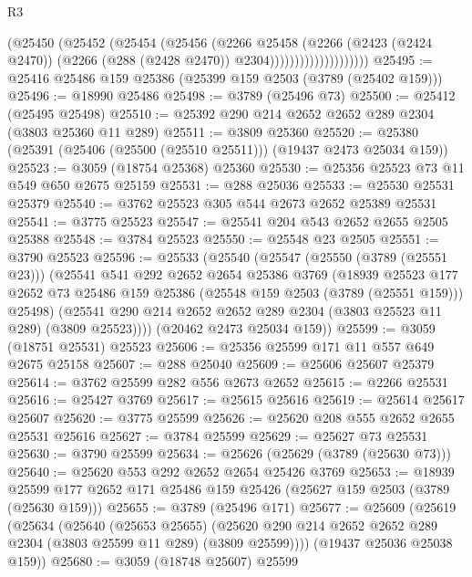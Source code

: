 \begin{lexlean}{R3}
\begin{coremodule}
                              (@25450
                                (@25452
                                  (@25454
                                    (@25456
                                      (@2266
                                        @25458
                                        (@2266
                                          (@2423 (@2424 @2470))
                                          (@2266 (@288 (@2428 @2470)) @2304))))))))))))))))))))
@25495 := @25416 @25486 @159 @25386 (@25399 @159 @2503 (@3789 (@25402 @159)))
@25496 := @18990 @25486
@25498 := @3789 (@25496 @73)
@25500 := @25412 (@25495 @25498)
@25510 := @25392 @290 @214 @2652 @2652 @289 @2304 (@3803 @25360 @11 @289)
@25511 := @3809 @25360
@25520 := @25380 (@25391 (@25406 (@25500 (@25510 @25511))) (@19437 @2473 @25034 @159))
@25523 := @3059 (@18754 @25368) @25360
@25530 := @25356 @25523 @73 @11 @549 @650 @2675 @25159
@25531 := @288 @25036
@25533 := @25530 @25531 @25379
@25540 := @3762 @25523 @305 @544 @2673 @2652 @25389 @25531
@25541 := @3775 @25523
@25547 := @25541 @204 @543 @2652 @2655 @2505 @25388
@25548 := @3784 @25523
@25550 := @25548 @23 @2505
@25551 := @3790 @25523
@25596 := @25533
    (@25540
      (@25547
        (@25550 (@3789 (@25551 @23)))
        (@25541
          @541
          @292
          @2652
          @2654
          @25386
          @3769
          (@18939
            @25523
            @177
            @2652
            @73
            @25486
            @159
            @25386
            (@25548 @159 @2503 (@3789 (@25551 @159)))
            @25498)
          (@25541 @290 @214 @2652 @2652 @289 @2304 (@3803 @25523 @11 @289) (@3809 @25523))))
      (@20462 @2473 @25034 @159))
@25599 := @3059 (@18751 @25531) @25523
@25606 := @25356 @25599 @171 @11 @557 @649 @2675 @25158
@25607 := @288 @25040
@25609 := @25606 @25607 @25379
@25614 := @3762 @25599 @282 @556 @2673 @2652
@25615 := @2266 @25531
@25616 := @25427 @3769
@25617 := @25615 @25616
@25619 := @25614 @25617 @25607
@25620 := @3775 @25599
@25626 := @25620 @208 @555 @2652 @2655 @25531 @25616
@25627 := @3784 @25599
@25629 := @25627 @73 @25531
@25630 := @3790 @25599
@25634 := @25626 (@25629 (@3789 (@25630 @73)))
@25640 := @25620 @553 @292 @2652 @2654 @25426 @3769
@25653 := @18939 @25599 @177 @2652 @171 @25486 @159 @25426 (@25627 @159 @2503 (@3789 (@25630 @159)))
@25655 := @3789 (@25496 @171)
@25677 := @25609
    (@25619
      (@25634
        (@25640
          (@25653 @25655)
          (@25620 @290 @214 @2652 @2652 @289 @2304 (@3803 @25599 @11 @289) (@3809 @25599))))
      (@19437 @25036 @25038 @159))
@25680 := @3059 (@18748 @25607) @25599

\end{coremodule}
\end{lexlean}
